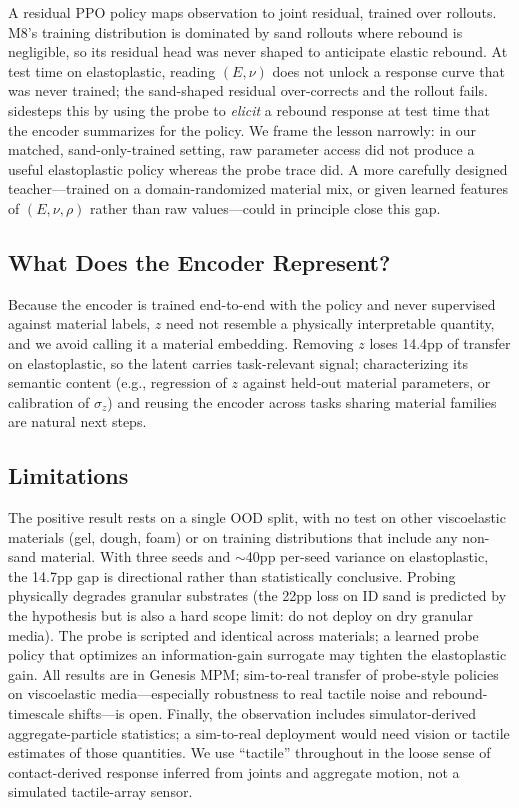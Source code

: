 A residual PPO policy maps observation to joint residual, trained over rollouts. M8's training distribution is dominated by sand rollouts where rebound is negligible, so its residual head was never shaped to anticipate elastic rebound. At test time on elastoplastic, reading $(E, \nu)$ does not unlock a response curve that was never trained; the sand-shaped residual over-corrects and the rollout fails. \PTA{} sidesteps this by using the probe to \emph{elicit} a rebound response at test time that the encoder summarizes for the policy. We frame the lesson narrowly: in our matched, sand-only-trained setting, raw parameter access did not produce a useful elastoplastic policy whereas the probe trace did. A more carefully designed teacher---trained on a domain-randomized material mix, or given learned features of $(E,\nu,\rho)$ rather than raw values---could in principle close this gap.

\subsection{What Does the Encoder Represent?}

Because the encoder is trained end-to-end with the policy and never supervised against material labels, $z$ need not resemble a physically interpretable quantity, and we avoid calling it a material embedding. Removing $z$ loses 14.4pp of transfer on elastoplastic, so the latent carries task-relevant signal; characterizing its semantic content (e.g., regression of $z$ against held-out material parameters, or calibration of $\sigma_z$) and reusing the encoder across tasks sharing material families are natural next steps.

\subsection{Limitations}

The positive result rests on a single OOD split, with no test on other viscoelastic materials (gel, dough, foam) or on training distributions that include any non-sand material. With three seeds and $\sim$40pp per-seed variance on elastoplastic, the 14.7pp gap is directional rather than statistically conclusive. Probing physically degrades granular substrates (the 22pp loss on ID sand is predicted by the hypothesis but is also a hard scope limit: do not deploy \PTA{} on dry granular media). The probe is scripted and identical across materials; a learned probe policy that optimizes an information-gain surrogate may tighten the elastoplastic gain. All results are in Genesis MPM; sim-to-real transfer of probe-style policies on viscoelastic media---especially robustness to real tactile noise and rebound-timescale shifts---is open. Finally, the observation includes simulator-derived aggregate-particle statistics; a sim-to-real deployment would need vision or tactile estimates of those quantities. We use ``tactile'' throughout in the loose sense of contact-derived response inferred from joints and aggregate motion, not a simulated tactile-array sensor.


